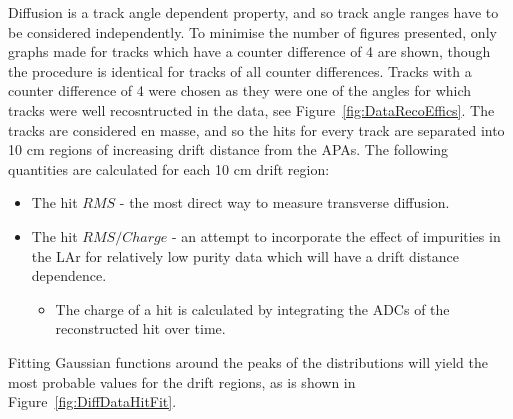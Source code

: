 Diffusion is a track angle dependent property, and so track angle ranges have to be considered independently. To minimise the number of figures presented, only graphs made for tracks which have a counter difference of 4 are shown, though the procedure is identical for tracks of all counter differences. Tracks with a counter difference of 4 were chosen as they were one of the angles for which tracks were well recosntructed in the data, see Figure~\ref{fig:DataRecoEffics}. The tracks are considered en masse, and so the hits for every track are separated into 10 cm regions of increasing drift distance from the APAs. The following quantities are calculated for each 10 cm drift region:
\begin{itemize}
\item The hit $RMS$ - the most direct way to measure transverse diffusion.
\item The hit $RMS/Charge$ - an attempt to incorporate the effect of impurities in the LAr for relatively low purity data which will have a drift distance dependence.
  \begin{itemize}
  \item The charge of a hit is calculated by integrating the ADCs of the reconstructed hit over time. 
  \end{itemize}
\end{itemize}
Fitting Gaussian functions around the peaks of the distributions will yield the most probable values for the drift regions, as is shown in Figure~\ref{fig:DiffDataHitFit}. \\

